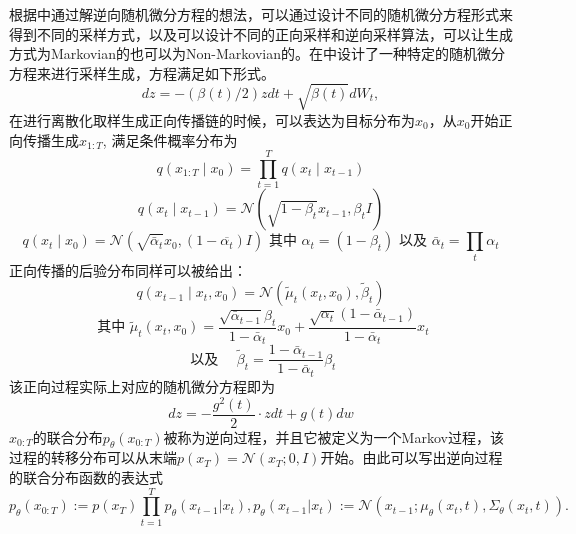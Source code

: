根据\cite{score_based_SDE}中通过解逆向随机微分方程的想法，可以通过设计不同的随机微分方程形式来得到不同的采样方式，以及可以设计不同的正向采样和逆向采样算法，可以让生成方式为Markovian的也可以为Non-Markovian的。在\cite{DDPM}中设计了一种特定的随机微分方程来进行采样生成，方程满足如下形式。
\begin{equation}
    dz = -\left(\beta(t)/2\right)z dt + \sqrt{\beta(t)}dW_t,
    \label{DDPM Equation}
\end{equation}
在进行离散化取样生成正向传播链的时候，可以表达为目标分布为$x_0$，从$x_0$开始正向传播生成$x_{1:T}$, 满足条件概率分布为
\begin{equation}
    q\left(x_{1: T} \mid x_0\right)=\prod_{t=1}^T q\left(x_t \mid x_{t-1}\right)
    \end{equation}
    \begin{equation}
        q\left(x_t \mid x_{t-1}\right)=\mathcal{N}\left(\sqrt{1-\beta_t} x_{t-1}, \beta_t I\right)
        \end{equation}
        \begin{equation}
            q\left(x_t \mid x_0\right)=\mathcal{N}\left(\sqrt{\bar{\alpha}_t} x_0,\left(1-\overline{\alpha_t}\right) I\right) \text { 其中 } \alpha_t=\left(1-\beta_t\right) \text { 以及 } \bar{\alpha}_t=\prod_t \alpha_t
            \label{posterior of xt}
            \end{equation}
    正向传播的后验分布同样可以被给出：
    \begin{equation}
        q\left(x_{t-1} \mid x_t, x_0\right)=\mathcal{N}\left(\tilde{\mu}_t\left(x_t, x_0\right), \tilde{\beta}_t\right)
        \label{posterior xt 2}
        \end{equation}
        \begin{equation}
            \text {     其中 } \tilde{\mu}_t\left(x_t, x_0\right)=\frac{\sqrt{\bar{\alpha}_{t-1}} \beta_t}{1-\bar{\alpha}_t} x_0+\frac{\sqrt{\alpha_t}\left(1-\bar{\alpha}_{t-1}\right)}{1-\bar{\alpha}_t} x_t
            \end{equation}
            \begin{equation}
                \text { 以及 } \quad \tilde{\beta}_t=\frac{1-\bar{\alpha}_{t-1}}{1-\bar{\alpha}_t} \beta_t
                \end{equation}
该正向过程实际上对应的随机微分方程即为
\begin{equation}
    dz = -\frac{g^2(t)}{2}\cdot  z dt + g(t)dw
\end{equation}
$x_{0:T}$的联合分布$p_{\theta}(x_{0:T})$被称为逆向过程，并且它被定义为一个Markov过程，该过程的转移分布可以从末端$p(x_T)= \mathcal{N}(x_T;0,I) $开始。由此可以写出逆向过程的联合分布函数的表达式
\begin{equation}
    p_{\theta}(x_{0:T}) := p(x_T)\prod_{t=1}^{T}p_{\theta}(x_{t-1}|x_t), p_{\theta}(x_{t-1}|x_t) :=\mathcal{N}(x_{t-1};\mu_{\theta}(x_t,t),\Sigma_{\theta}(x_t,t)).  
\end{equation}

